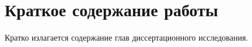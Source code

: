 \section{Краткое содержание работы}

Кратко излагается содержание глав диссертационного исследования.
